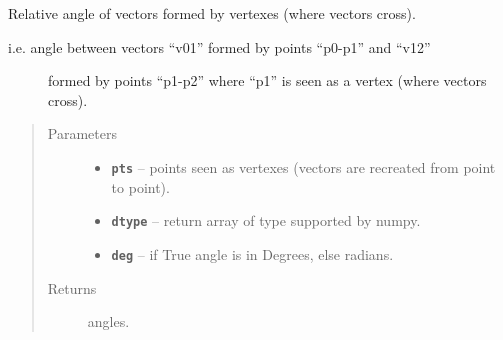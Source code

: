 \documentclass[letterpaper,10pt,english]{sphinxmanual}
\begin{document}
\begin{fulllineitems}
\label{RRtoolbox.lib.arrayops:RRtoolbox.lib.arrayops.basic.vertexesAngles}
Relative angle of vectors formed by vertexes (where vectors cross).
\begin{description}
\item[{i.e. angle between vectors ``v01'' formed by points ``p0-p1'' and ``v12''}] \leavevmode
formed by points ``p1-p2'' where ``p1'' is seen as a vertex (where vectors cross).

\end{description}
\begin{quote}\begin{description}
\item[{Parameters}] \leavevmode\begin{itemize}
\item {} 
\textbf{\texttt{pts}} -- points seen as vertexes (vectors are recreated from point to point).

\item {} 
\textbf{\texttt{dtype}} -- return array of type supported by numpy.

\item {} 
\textbf{\texttt{deg}} -- if True angle is in Degrees, else radians.

\end{itemize}

\item[{Returns}] \leavevmode
angles.

\end{description}\end{quote}

\end{fulllineitems}

\end{document}
